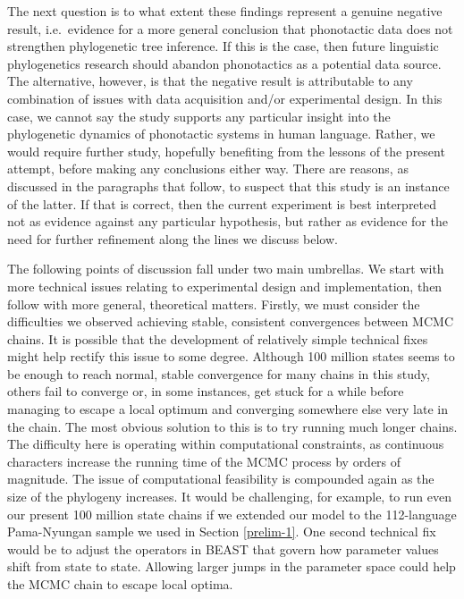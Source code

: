 The next question is to what extent these findings represent a genuine negative result, i.e.~evidence for a more general conclusion that phonotactic data does not strengthen phylogenetic tree inference. If this is the case, then future linguistic phylogenetics research should abandon phonotactics as a potential data source. The alternative, however, is that the negative result is attributable to any combination of issues with data acquisition and/or experimental design. In this case, we cannot say the study supports any particular insight into the phylogenetic dynamics of phonotactic systems in human language. Rather, we would require further study, hopefully benefiting from the lessons of the present attempt, before making any conclusions either way. There are reasons, as discussed in the paragraphs that follow, to suspect that this study is an instance of the latter. If that is correct, then the current experiment is best interpreted not as evidence against any particular hypothesis, but rather as evidence for the need for further refinement along the lines we discuss below.

The following points of discussion fall under two main umbrellas. We start with more technical issues relating to experimental design and implementation, then follow with more general, theoretical matters. Firstly, we must consider the difficulties we observed achieving stable, consistent convergences between MCMC chains. It is possible that the development of relatively simple technical fixes might help rectify this issue to some degree. Although 100 million states seems to be enough to reach normal, stable convergence for many chains in this study, others fail to converge or, in some instances, get stuck for a while before managing to escape a local optimum and converging somewhere else very late in the chain. The most obvious solution to this is to try running much longer chains. The difficulty here is operating within computational constraints, as continuous characters increase the running time of the MCMC process by orders of magnitude. The issue of computational feasibility is compounded again as the size of the phylogeny increases. It would be challenging, for example, to run even our present 100 million state chains if we extended our model to the 112-language Pama-Nyungan sample we used in Section \ref{prelim-1}. One second technical fix would be to adjust the operators in BEAST that govern how parameter values shift from state to state. Allowing larger jumps in the parameter space could help the MCMC chain to escape local optima.

